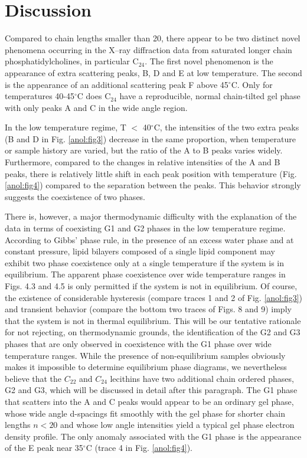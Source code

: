 \section{Discussion}

Compared to chain lengths smaller than 20,
there appear to be two distinct novel phenomena occurring in the 
X--ray diffraction data from saturated longer chain phosphatidylcholines, in
particular C$_{24}$.  The first novel phenomenon is the appearance of extra scattering 
peaks, B, D and E at low temperature. 
The second is the appearance of an additional scattering peak F above 
45$^{\circ}$C. Only for temperatures 40-45$^{\circ }$C does C$_{24}$ have a 
reproducible, normal chain-tilted gel phase with only peaks A and C in the wide 
angle region.

In the low temperature regime, T $<$ 40$^{\circ }$C,
the intensities of the two extra peaks (B and D in Fig. \ref{anol:fig3}) decrease
in the same proportion, when temperature or sample history are varied, 
but the ratio of the A to B peaks varies widely.  Furthermore, compared to the
changes in relative intensities of the A and B peaks, there is relatively 
little shift in each peak position with temperature (Fig. \ref{anol:fig4}) compared to
the separation between the peaks.  This behavior strongly suggests the
coexistence of two phases. 

There is, however, a major thermodynamic difficulty with the explanation of the
data in terms of coexisting G1 and G2 phases in the low temperature
regime.  According to Gibbs' phase rule, in the presence of an excess
water phase and at constant pressure, lipid bilayers composed of a single
lipid component may exhibit two phase coexistence only at a single temperature 
if the system is in equilibrium.  The apparent phase coexistence over
wide temperature ranges in Figs. 4.3 and 4.5 is only permitted if the 
system is not in equilibrium.  Of course, the existence of 
considerable hysteresis (compare traces 1 and 2 of Fig. \ref{anol:fig3}) and
transient behavior (compare the bottom two traces of Figs. 8 and 9) imply
that the system is not in thermal equilibrium. This will be our tentative
rationale for not rejecting, on thermodynamic
grounds, the identification of the G2 and G3 phases that are only
observed in coexistence with the G1 phase over wide temperature ranges.
While the presence of non-equilibrium samples obviously
makes it impossible to determine
equilibrium phase diagrams, we nevertheless believe that the $C_{22}$ and $C_{24}$
lecithins have two additional chain ordered phases, G2 and G3,
which will be discussed in detail after this paragraph.
The G1 phase that scatters into the A and C peaks would
appear to be an ordinary gel phase, whose wide angle d-spacings fit
smoothly with the gel phase for shorter chain lengths $n < 20$ 
and whose low angle intensities yield a typical gel phase electron
density profile.  The only anomaly associated with the G1 phase is the
appearance of the E peak near 35$^{\circ }$C (trace 4 in Fig. \ref{anol:fig4}).

